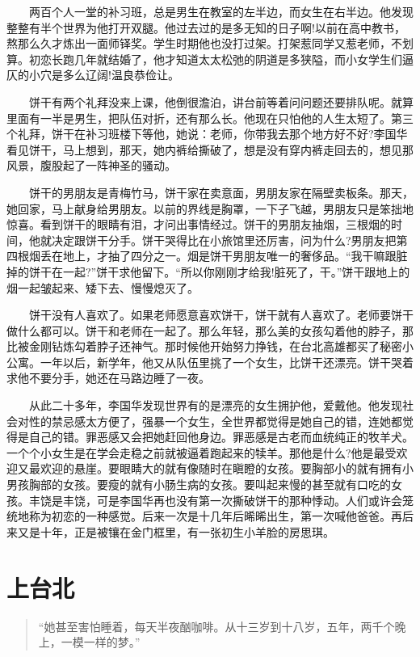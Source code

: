 \documentclass[12pt,UTF8]{ctexbook}
\begin{document}
　　两百个人一堂的补习班，总是男生在教室的左半边，而女生在右半边。他发现整整有半个世界为他打开双腿。他过去过的是多无知的日子啊!以前在高中教书，熬那么久才炼出一面师铎奖。学生时期他也没打过架。打架惹同学又惹老师，不划算。初恋长跑几年就结婚了，他才知道太太松弛的阴道是多狭隘，而小女学生们逼仄的小穴是多么辽阔!温良恭俭让。

　　饼干有两个礼拜没来上课，他倒很澹泊，讲台前等着问问题还要排队呢。就算里面有一半是男生，把队伍对折，还有那么长。他现在只怕他的人生太短了。第三个礼拜，饼干在补习班楼下等他，她说：老师，你带我去那个地方好不好?李国华看见饼干，马上想到，那天，她内裤给撕破了，想是没有穿内裤走回去的，想见那风景，腹股起了一阵神圣的骚动。

　　饼干的男朋友是青梅竹马，饼干家在卖意面，男朋友家在隔壁卖板条。那天，她回家，马上献身给男朋友。以前的界线是胸罩，一下子飞越，男朋友只是笨拙地惊喜。看到饼干的眼睛有泪，才问出事情经过。饼干的男朋友抽烟，三根烟的时间，他就决定跟饼干分手。饼干哭得比在小旅馆里还厉害，问为什么?男朋友把第四根烟丢在地上，才抽了四分之一。烟是饼干男朋友唯一的奢侈品。\enquote{我干嘛跟脏掉的饼干在一起?}饼干求他留下。\enquote{所以你刚刚才给我!脏死了，干。}饼干跟地上的烟一起皱起来、矮下去、慢慢熄灭了。

　　饼干没有人喜欢了。如果老师愿意喜欢饼干，饼干就有人喜欢了。老师要饼干做什么都可以。饼干和老师在一起了。那么年轻，那么美的女孩勾着他的脖子，那比被金刚钻炼勾着脖子还神气。那时候他开始努力挣钱，在台北高雄都买了秘密小公寓。一年以后，新学年，他又从队伍里挑了一个女生，比饼干还漂亮。饼干哭着求他不要分手，她还在马路边睡了一夜。

　　从此二十多年，李国华发现世界有的是漂亮的女生拥护他，爱戴他。他发现社会对性的禁忌感太方便了，强暴一个女生，全世界都觉得是她自己的错，连她都觉得是自己的错。罪恶感又会把她赶回他身边。罪恶感是古老而血统纯正的牧羊犬。一个个小女生是在学会走稳之前就被逼着跑起来的犊羊。那他是什么?他是最受欢迎又最欢迎的悬崖。要眼睛大的就有像随时在瞋瞪的女孩。要胸部小的就有拥有小男孩胸部的女孩。要瘦的就有小肠生病的女孩。要叫起来慢的甚至就有口吃的女孩。丰饶是丰饶，可是李国华再也没有第一次撕破饼干的那种悸动。人们或许会笼统地称为初恋的一种感觉。后来一次是十几年后晞晞出生，第一次喊他爸爸。再后来又是十年，正是被镶在金门框里，有一张初生小羊脸的房思琪。

\hypertarget{ux4e0aux53f0ux5317}{%
\section*{上台北}\label{ux4e0aux53f0ux5317}}

\begin{quote}
\enquote{她甚至害怕睡着，每天半夜酗咖啡。从十三岁到十八岁，五年，两千个晚上，一模一样的梦。}
\end{quote}
\end{document}
